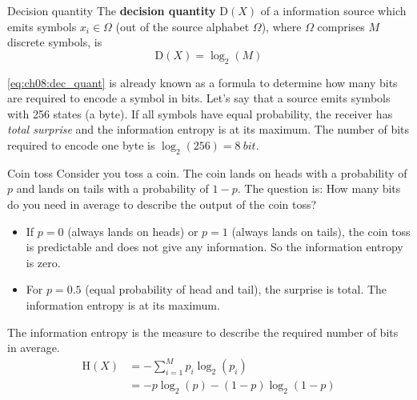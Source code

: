 \begin{refsection}
\begin{definition}{Decision quantity}
	The  \textbf{decision quantity} $\mathrm{D}(X)$ of a information source which emits symbols $x_i \in \Omega$ (out of the source alphabet $\Omega$), where $\Omega$ comprises $M$ discrete symbols, is
	\begin{equation}
		\mathrm{D}(X) = \log_2 \left(M\right)
		\label{eq:ch08:dec_quant}
	\end{equation}
\end{definition}

\eqref{eq:ch08:dec_quant} is already known as a formula to determine how many bits are required to encode a symbol in bits. Let's say that a source emits symbols with 256 states (a byte). If all symbols have equal probability, the receiver has \emph{total surprise} and the information entropy is at its maximum. The number of bits required to encode one byte is $\log_2 \left(256\right) = \SI{8}{bit}$.

\begin{example}{Coin toss}
	Consider you toss a coin. The coin lands on heads with a probability of $p$ and lands on tails with a probability of $1-p$. The question is: How many bits do you need in average to describe the output of the coin toss?
	\begin{itemize}
		\item If $p=0$ (always lands on heads) or $p=1$ (always lands on tails), the coin toss is predictable and does not give any information. So the information entropy is zero.
		\item For $p=0.5$ (equal probability of head and tail), the surprise is total. The information entropy is at its maximum.
	\end{itemize}
	The information entropy is the measure to describe the required number of bits in average.
	\begin{equation}
		\begin{split}
			\mathrm{H}(X) &= - \sum\limits_{i=1}^{M} p_i \log_2 \left(p_i\right) \\
			 &= - p \log_2 \left(p\right) - \left(1-p\right) \log_2 \left(1-p\right)
		\end{split}
	\end{equation}
	

\end{example}
\end{refsection}
